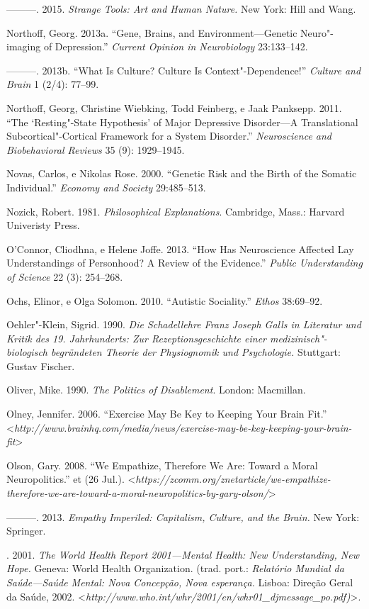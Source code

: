 ---------. 2015. \emph{Strange Tools: Art and Human Nature.} New York:
Hill and Wang.

Northoff, Georg. 2013a. ``Gene, Brains, and Environment---Genetic
Neuro"-imaging of Depression.'' \emph{Current Opinion in Neurobiology}
23:133--142.

---------. 2013b. ``What Is Culture? Culture Is Context"-Dependence!''
\emph{Culture and Brain} 1 (2/4): 77--99.

Northoff, Georg, Christine Wiebking, Todd Feinberg, e Jaak Panksepp.
2011. ``The `Resting"-State Hypothesis' of Major Depressive Disorder---A
Translational Subcortical"-Cortical Framework for a System Disorder.''
\emph{Neuroscience and Biobehavioral Reviews} 35 (9): 1929--1945.

Novas, Carlos, e Nikolas Rose. 2000. ``Genetic Risk and the Birth of the
Somatic Individual.'' \emph{Economy and Society} 29:485--513.

Nozick, Robert. 1981. \emph{Philosophical Explanations}. Cambridge,
Mass.: Harvard Univeristy Press.

O'Connor, Cliodhna, e Helene Joffe. 2013. ``How Has Neuroscience
Affected Lay Understandings of Personhood? A Review of the Evidence.''
\emph{Public Understanding of Science} 22 (3): 254--268.

Ochs, Elinor, e Olga Solomon. 2010. ``Autistic Sociality.'' \emph{Ethos}
38:69--92.

Oehler"-Klein, Sigrid. 1990. \emph{Die Schadellehre Franz Joseph Galls in
Literatur und Kritik des 19. Jahrhunderts: Zur Rezeptionsgeschichte
einer medizinisch"-biologisch begründeten Theorie der Physiognomik und
Psychologie.} Stuttgart: Gustav Fischer.

Oliver, Mike. 1990. \emph{The Politics of Disablement}. London:
Macmillan.

Olney, Jennifer. 2006. ``Exercise May Be Key to Keeping Your Brain
Fit.''
\textless{}\emph{http://www.brainhq.com/media/news/exercise-may-be-key-keeping-your-brain-fit}\textgreater{}

Olson, Gary. 2008. ``We Empathize, Therefore We Are: Toward a Moral
Neuropolitics.'' et (26 Jul.).
\textless{}\emph{https://zcomm.org/znetarticle/we-empathize-therefore-we-are-toward-a-moral-neuropolitics-by-gary-olson/}\textgreater{}

---------. 2013. \emph{Empathy} \emph{Imperiled: Capitalism, Culture,
and the Brain.} New York: Springer.

. 2001. \emph{The World Health Report 2001---Mental Health: New
Understanding, New Hope.} Geneva: World Health Organization. (trad.
port.: \emph{Relatório Mundial da Saúde---Saúde Mental: Nova Concepção,
Nova esperança.} Lisboa: Direção Geral da Saúde, 2002.
\textless{}\emph{http://www.who.int/whr/2001/en/whr01\_djmessage\_po.pdf)}\textgreater{}.


